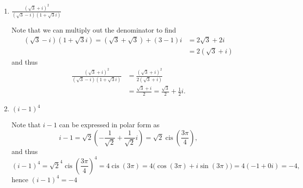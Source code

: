 \documentclass[11pt]{article}
\begin{document}
\begin{enumerate}
\begin{enumerate}
\begin{Solution}
   \end{Solution}
   \item $\displaystyle\frac{(\sqrt{3}+i)^2}{(\sqrt{3}-i)(1+\sqrt{3}i)}$
   \begin{Solution}
Note that we can multiply out the denominator to find
\begin{align*}
 (\sqrt{3}-i)(1+\sqrt{3}i) = (\sqrt{3}+\sqrt{3}) + (3-1)i &= 2\sqrt{3} + 2i\\ &= 2(\sqrt{3}+i)
\end{align*}
and thus 
\begin{align*}
 \frac{(\sqrt{3}+i)^2}{(\sqrt{3}-i)(1+\sqrt{3}i)} &= \frac{(\sqrt{3}+i)^2}{2(\sqrt{3}+i)} \\
 &=\frac{\sqrt{3}+i}{2} = \frac{\sqrt{3}}{2} + \frac{1}{2}i.
\end{align*}
    \begin{center}
\end{center}
\end{Solution}
   \item $(i-1)^4$
   \begin{Solution}
Note that $i-1$ can be expressed in polar form as
\[
 i-1 = \sqrt{2}\left(-\frac{1}{\sqrt{2}}+\frac{1}{\sqrt{2}}i\right) = \sqrt{2}\operatorname{cis}\left(\frac{3\pi}{4}\right),
\]
and thus 
\[
 (i-1)^4 = \sqrt{2}^4 \operatorname{cis}\left(\frac{3\pi}{4}\right)^4 = 4\operatorname{cis}\left(3\pi\right) = 4\bigl(\cos(3\pi)+i\sin(3\pi)) = 4(-1+0i) = -4,
\]
hence  $(i-1)^4=-4$
\begin{center}
\end{center}
\end{Solution}


\end{enumerate}
\end{enumerate}
\end{document}

